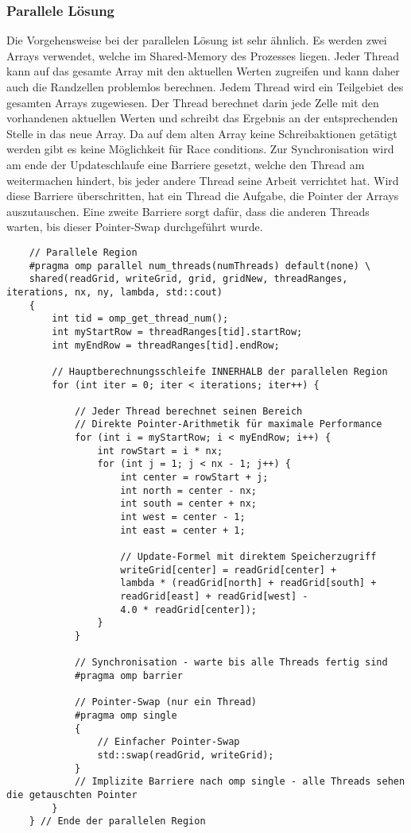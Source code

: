 \subsubsection{Parallele Lösung 
\label{parallelisierung:sub:parLoesung}}
Die Vorgehensweise bei der parallelen Lösung ist sehr ähnlich.
Es werden zwei Arrays verwendet, welche im Shared-Memory des Prozesses liegen.
Jeder Thread kann auf das gesamte Array mit den aktuellen Werten zugreifen und kann daher auch die Randzellen problemlos berechnen.
Jedem Thread wird ein Teilgebiet des gesamten Arrays zugewiesen.
Der Thread berechnet darin jede Zelle mit den vorhandenen aktuellen Werten und schreibt das Ergebnis an der entsprechenden Stelle in das neue Array.
Da auf dem alten Array keine Schreibaktionen getätigt werden gibt es keine Möglichkeit für Race conditions.
Zur Synchronisation wird am ende der Updateschlaufe eine Barriere gesetzt, welche den Thread am weitermachen hindert, bis jeder andere Thread seine Arbeit verrichtet hat.
Wird diese Barriere überschritten, hat ein Thread die Aufgabe, die Pointer der Arrays auszutauschen.
Eine zweite Barriere sorgt dafür, dass die anderen Threads warten, bis dieser Pointer-Swap durchgeführt wurde.

\begin{lstlisting}
	// Parallele Region
	#pragma omp parallel num_threads(numThreads) default(none) \
	shared(readGrid, writeGrid, grid, gridNew, threadRanges, iterations, nx, ny, lambda, std::cout)
	{
		int tid = omp_get_thread_num();
		int myStartRow = threadRanges[tid].startRow;
		int myEndRow = threadRanges[tid].endRow;
		
		// Hauptberechnungsschleife INNERHALB der parallelen Region
		for (int iter = 0; iter < iterations; iter++) {
			
			// Jeder Thread berechnet seinen Bereich
			// Direkte Pointer-Arithmetik für maximale Performance
			for (int i = myStartRow; i < myEndRow; i++) {
				int rowStart = i * nx;
				for (int j = 1; j < nx - 1; j++) {
					int center = rowStart + j;
					int north = center - nx;
					int south = center + nx;
					int west = center - 1;
					int east = center + 1;
					
					// Update-Formel mit direktem Speicherzugriff
					writeGrid[center] = readGrid[center] +
					lambda * (readGrid[north] + readGrid[south] +
					readGrid[east] + readGrid[west] -
					4.0 * readGrid[center]);
				}
			}
			
			// Synchronisation - warte bis alle Threads fertig sind
			#pragma omp barrier
			
			// Pointer-Swap (nur ein Thread)
			#pragma omp single
			{
				// Einfacher Pointer-Swap
				std::swap(readGrid, writeGrid);
			}
			// Implizite Barriere nach omp single - alle Threads sehen die getauschten Pointer
		}
	} // Ende der parallelen Region
\end{lstlisting}

